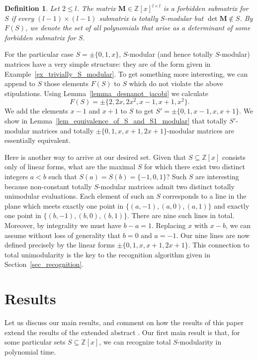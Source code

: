 \documentclass[a4paper, 11pt]{article}
\newcommand{\Z}{\mathbb{Z}}
\newcommand{\bM}{\bm{M}}
\newcommand{\indet}{x}
\newcommand{\polyring}{\Z[\indet]}
\newcommand{\polyS}{S}
\newcommand{\polyM}{\bM}
\newtheorem{definition}{Definition}
\begin{document}
	\begin{definition}
	\label{def_forbidden_submatrix}
	Let $2\leq l$. The matrix $\polyM\in \polyring^{l\times l}$ is a \emph{forbidden submatrix for} $\polyS$ if every $(l-1)\times (l-1)$ submatrix is totally $\polyS$-modular but $\det\polyM\notin \polyS$. By $F(\polyS)$, we denote the set of all polynomials that arise as a determinant of some forbidden submatrix for $\polyS$.
	\end{definition}
For the particular case $\polyS=\pm\{0,1,x\}$, $\polyS$-modular (and hence totally $\polyS$-modular) matrices have a very simple structure: they are of the form given in Example~\ref{ex_trivially_S_modular}. To get something more interesting, we can append to $\polyS$ those elements $F(\polyS)$ to $S$ which do not violate the above stipulations. Using Lemma~\ref{lemma_desnanot_jacobi} we calculate
\[
F(\polyS)=\pm\{2,2x,2x^2,x-1,x+1,x^2\}.
\]
We add the elements $x-1$ and $x+1$ to $\polyS$ to get $\polyS'=\pm\{0,1,x-1,x,x+1\}$. We show in Lemma~\ref{lem_equivalence_of_S_and_S1_modular} that totally $\polyS'$-modular matrices and totally $\pm\{0,1,x,x+1,2x+1\}$-modular matrices are essentially equivalent.

Here is another way to arrive at our desired set. Given that $\polyS\subseteq\polyring$ consists only of linear forms, what are the maximal $\polyS$ for which there exist two distinct integers $a<b$ such that $\polyS(a)=\polyS(b)=\{-1,0,1\}$? Such $\polyS$ are interesting because non-constant totally $\polyS$-modular matrices admit two distinct totally unimodular evaluations. Each element of such an $\polyS$ corresponds to a line in the plane which meets exactly one point in $\{(a,-1),(a,0),(a,1)\}$ and exactly one point in $\{(b,-1),(b,0),(b,1)\}$. There are nine such lines in total. Moreover, by integrality we must have $b-a=1$. Replacing $x$ with $x-b$, we can assume without loss of generality that $b=0$ and $a=-1$. Our nine lines are now defined precisely by the linear forms $\pm\{0,1,x,x+1,2x+1\}$. This connection to total unimodularity is the key to the recognition algorithm given in Section~\ref{sec_recognition}.
\section{Results}
	\label{sec_results}
	Let us discuss our main results, and comment on how the results of this paper extend the results of the extended abstract \cite{celayakuhlmannweismantel2024matricespolynomial}. 
	Our first main result is that, for some particular sets $\polyS\subseteq\polyring$, we can
	recognize total $\polyS$-modularity in polynomial time. 
\end{document}
